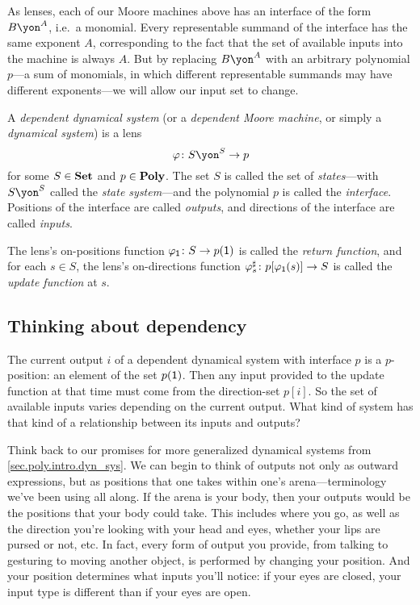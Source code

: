 \documentclass[Book-Poly]{subfiles}
\begin{document}
As lenses, each of our Moore machines above has an interface of the form $B\yon^A$, i.e.\ a monomial.
Every representable summand of the interface has the same exponent $A$, corresponding to the fact that the set of available inputs into the machine is always $A$.
But by replacing $B\yon^A$ with an arbitrary polynomial $p$---a sum of monomials, in which different representable summands may have different exponents---we will allow our input set to change.

\begin{definition}\label{def.gen_moore}
A \emph{dependent dynamical system} (or a \emph{dependent Moore machine}, or simply a \emph{dynamical system}) is a lens
\[\varphi\colon S\yon^S\to p\]
for some $S\in\mathbf{Set}$ and $p\in\mathbf{Poly}$. The set $S$ is called the set of \emph{states}---with $S\yon^S$ called the \emph{state system}---and the polynomial $p$ is called the \emph{interface}.
Positions of the interface are called \emph{outputs}, and directions of the interface are called \emph{inputs}.

The lens's on-positions function $\varphi_{\textsf{1}}\colon S\to p(\textsf{1})$ is called the \emph{return function}, and for each $s\in S$, the lens's on-directions function $\varphi^\sharp_s\colon p[\varphi_{\textsf{1}}(s)]\to S$ is called the \emph{update function} at $s$.
\end{definition}

\subsection{Thinking about dependency}

The current output $i$ of a dependent dynamical system with interface $p$ is a $p$-position: an element of the set $p(\textsf{1})$.
Then any input provided to the update function at that time must come from the direction-set $p[i]$.
So the set of available inputs varies depending on the current output.
What kind of system has that kind of a relationship between its inputs and outputs?

Think back to our promises for more generalized dynamical systems from \cref{sec.poly.intro.dyn_sys}.
We can begin to think of outputs not only as outward expressions, but as positions that one takes within one's arena---terminology we've been using all along.
If the arena is your body, then your outputs would be the positions that your body could take.
This includes where you go, as well as the direction you're looking with your head and eyes, whether your lips are pursed or not, etc.
In fact, every form of output you provide, from talking to gesturing to moving another object, is performed by changing your position. And your position determines what inputs you'll notice: if your eyes are closed, your input type is different than if your eyes are open.
\end{document}
